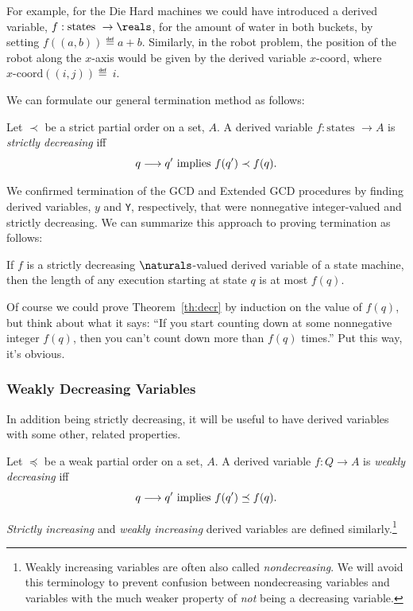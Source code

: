 For example, for the Die Hard machines we could have introduced a derived
variable, $f: \text{states } \to \reals$, for the amount of water in both
buckets, by setting $f((a, b)) \eqdef a + b$.  Similarly, in the robot
problem, the position of the robot along the $x$-axis would be given by
the derived variable $x\text{-coord}$, where $x\text{-coord}((i, j))
\eqdef~i$.

We can formulate our general termination method as follows:

\begin{definition}
  Let $\prec$ be a strict partial order on a set, $A$.  A derived variable
  $f : \text{states } \to A$ is \emph{strictly decreasing} iff
\[
q \mathrel{\longrightarrow} q' \text{  implies  } f(q') \prec f(q).
\]
\end{definition}

We confirmed termination of the GCD and Extended GCD procedures by finding
derived variables, $y$ and \texttt{Y}, respectively, that were nonnegative
integer-valued and strictly decreasing.  We can summarize this approach to
proving termination as follows:
\begin{theorem}
\label{th:decr}
If $f$ is a strictly decreasing $\naturals$-valued derived variable of a
state machine, then the length of any execution starting at state $q$ is
at most $f(q)$.
\end{theorem}

Of course we could prove Theorem~\ref{th:decr} by induction on the value
of $f(q)$, but think about what it says: ``If you start counting down at
some nonnegative integer $f(q)$, then you can't count down more than
$f(q)$ times.''  Put this way, it's obvious.

\subsubsection{Weakly Decreasing Variables}

In addition being strictly decreasing, it will be useful to have derived
variables with some other, related properties.

\begin{definition}
Let $\preceq$ be a weak partial order on a set, $A$.  A derived variable
$f : Q \to A$ is \emph{weakly decreasing} iff
\[
q \mathrel{\longrightarrow} q' \text{  implies  } f(q') \preceq f(q).
\]

\emph{Strictly increasing} and \emph{weakly increasing} derived variables
are defined similarly.\footnote{Weakly increasing variables are often also
called \emph{nondecreasing}.  We will avoid this terminology to prevent
confusion between nondecreasing variables and variables with the much
weaker property of \emph{not} being a decreasing variable.}
\end{definition}

